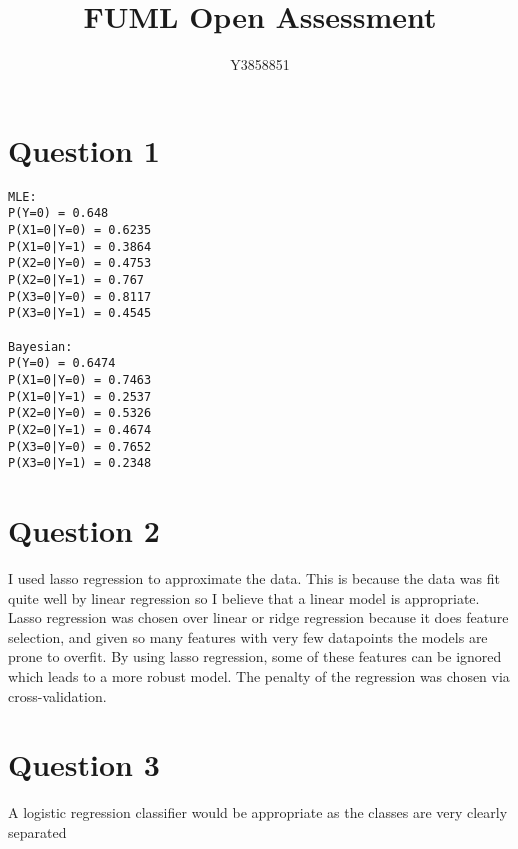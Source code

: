 \documentclass{article}
\title{FUML Open Assessment}
\author{Y3858851}
\date{}
\begin{document}
\maketitle

\section*{Question 1}
\begin{lstlisting}
MLE:
P(Y=0) = 0.648
P(X1=0|Y=0) = 0.6235
P(X1=0|Y=1) = 0.3864
P(X2=0|Y=0) = 0.4753
P(X2=0|Y=1) = 0.767
P(X3=0|Y=0) = 0.8117
P(X3=0|Y=1) = 0.4545

Bayesian:
P(Y=0) = 0.6474
P(X1=0|Y=0) = 0.7463
P(X1=0|Y=1) = 0.2537
P(X2=0|Y=0) = 0.5326
P(X2=0|Y=1) = 0.4674
P(X3=0|Y=0) = 0.7652
P(X3=0|Y=1) = 0.2348 
\end{lstlisting}

\section*{Question 2}
I used lasso regression to approximate the data. This is because the data was fit quite well by linear regression so I believe that a linear model is appropriate. Lasso regression was chosen over linear or ridge regression because it does feature selection, and given so many features with very few datapoints the models are prone to overfit. By using lasso regression, some of these features can be ignored which leads to a more robust model. The penalty of the regression was chosen via cross-validation.

\section*{Question 3}
A logistic regression classifier would be appropriate as the classes are very clearly separated
\end{document}
